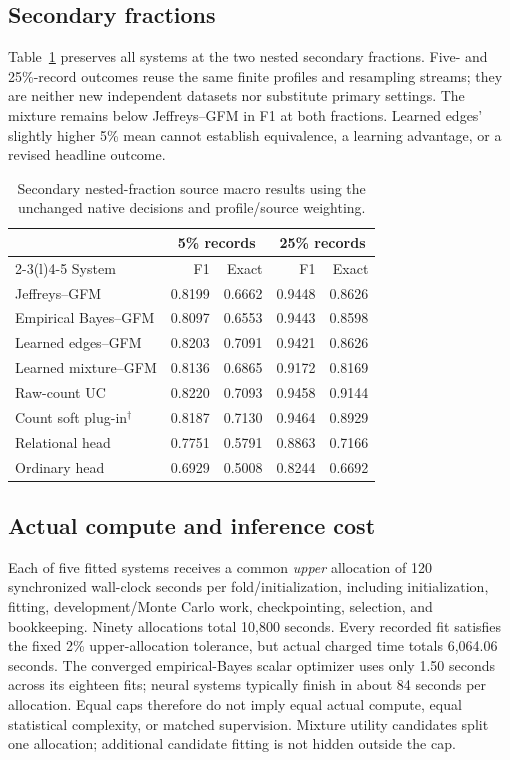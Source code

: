 \subsection{Secondary fractions}
Table~\ref{tab:posterior-native-fractions} preserves all systems at the two nested secondary fractions. Five- and 25\%-record outcomes reuse the same finite profiles and resampling streams; they are neither new independent datasets nor substitute primary settings. The mixture remains below Jeffreys--GFM in F1 at both fractions. Learned edges' slightly higher 5\% mean cannot establish equivalence, a learning advantage, or a revised headline outcome.
\begin{table}[ht]\centering\footnotesize
\begin{tabular*}{\linewidth}{@{\extracolsep{\fill}}lrrrr@{}}\toprule
& \multicolumn{2}{c}{5\% records} & \multicolumn{2}{c}{25\% records}\\\cmidrule(lr){2-3}\cmidrule(l){4-5}
System & F1 & Exact & F1 & Exact\\\midrule
Jeffreys--GFM & 0.8199 & 0.6662 & 0.9448 & 0.8626\\
Empirical Bayes--GFM & 0.8097 & 0.6553 & 0.9443 & 0.8598\\
Learned edges--GFM & 0.8203 & 0.7091 & 0.9421 & 0.8626\\
Learned mixture--GFM & 0.8136 & 0.6865 & 0.9172 & 0.8169\\
Raw-count UC & 0.8220 & 0.7093 & 0.9458 & 0.9144\\
Count soft plug-in$^{\dagger}$ & 0.8187 & 0.7130 & 0.9464 & 0.8929\\
Relational head & 0.7751 & 0.5791 & 0.8863 & 0.7166\\
Ordinary head & 0.6929 & 0.5008 & 0.8244 & 0.6692\\
\bottomrule\end{tabular*}
\caption{Secondary nested-fraction source macro results using the unchanged native decisions and profile/source weighting.}\label{tab:posterior-native-fractions}\end{table}

\subsection{Actual compute and inference cost}
Each of five fitted systems receives a common \emph{upper} allocation of 120 synchronized wall-clock seconds per fold/initialization, including initialization, fitting, development/Monte Carlo work, checkpointing, selection, and bookkeeping. Ninety allocations total 10,800 seconds. Every recorded fit satisfies the fixed 2\% upper-allocation tolerance, but actual charged time totals 6,064.06 seconds. The converged empirical-Bayes scalar optimizer uses only 1.50 seconds across its eighteen fits; neural systems typically finish in about 84 seconds per allocation. Equal caps therefore do not imply equal actual compute, equal statistical complexity, or matched supervision. Mixture utility candidates split one allocation; additional candidate fitting is not hidden outside the cap.

